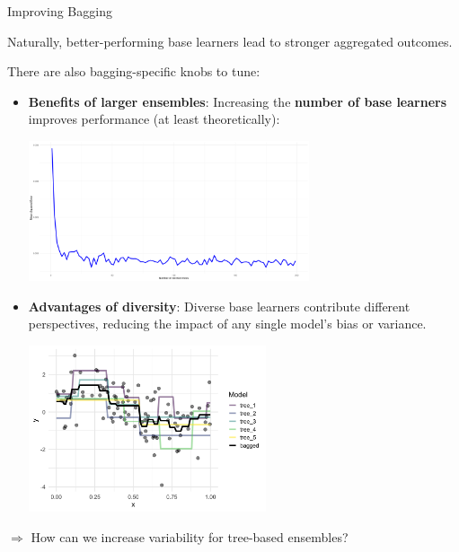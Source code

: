 \documentclass[11pt,compress,t,notes=noshow, xcolor=table]{beamer}
\begin{document}
\begin{vbframe}{Improving Bagging}

Naturally, better-performing base learners lead to stronger aggregated outcomes. \\

\vspace{1em}

There are also bagging-specific knobs to tune:
\begin{itemize}
  \item \textbf{Benefits of larger ensembles}: Increasing the \textbf{number of base learners} improves performance (at least theoretically):
  \begin{center}
  \includegraphics[width=0.65\textwidth]{figure/bagging-ntree_MSE.png}
  \end{center}
  
  \vspace{2em}

  \item \textbf{Advantages of diversity}: Diverse base learners contribute different perspectives, reducing the impact of any single model's bias or variance.
  \begin{center}
  \includegraphics[width=0.55\textwidth]{figure/bagging-fit.png}
  \end{center}
\end{itemize}

$\Rightarrow$ How can we increase variability for tree-based ensembles? \\

\end{vbframe}

\endlecture
\end{document}
